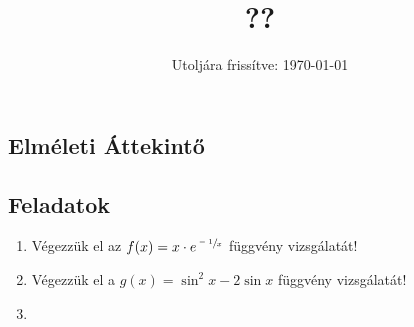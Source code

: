 \documentclass[a4paper, 12pt]{scrartcl}
\title{??}
\date{Utoljára frissítve: \today}
\begin{document}
\maketitle

\subsection{Elméleti Áttekintő}

\clearpage
\subsection{Feladatok}

\begin{enumerate}
  \item Végezzük el az $f(x) = x \cdot e^{\sfrac{-1}{x}}$ függvény vizsgálatát!

  \item Végezzük el a $g(x) = \sin^2 x - 2 \sin x$ függvény vizsgálatát!

  \item
\end{enumerate}

\end{document}
